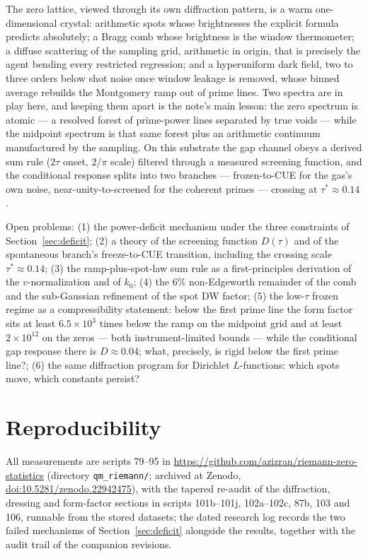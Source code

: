 \documentclass[12pt]{amsart}
\begin{document}
The zero lattice, viewed through its own diffraction pattern, is a warm
one-dimensional crystal: arithmetic spots whose brightnesses the
explicit formula predicts absolutely; a Bragg comb whose brightness is
the window thermometer; a diffuse scattering of the sampling grid,
arithmetic in origin, that is precisely the agent bending every
restricted regression; and a hyperuniform dark field, two to three
orders below shot noise once window leakage is removed, whose binned
average rebuilds the Montgomery ramp out of prime lines. Two spectra
are in play here, and keeping them apart is the note's main lesson:
the zero spectrum is atomic --- a resolved forest of prime-power lines
separated by true voids --- while the midpoint spectrum is that same
forest plus an arithmetic continuum manufactured by the sampling.
On this substrate the gap channel obeys a derived sum rule
($2\tau$ onset, $2/\pi$ scale) filtered through a measured screening
function, and the conditional response splits into two branches ---
frozen-to-CUE for the gas's own noise, near-unity-to-screened for the
coherent primes --- crossing at $\tau^* \approx 0.14$.

Open problems: (1) the power-deficit mechanism under the three
constraints of Section~\ref{sec:deficit}; (2) a theory of the screening
function $D(\tau)$ and of the spontaneous branch's freeze-to-CUE
transition, including the crossing scale $\tau^* \approx 0.14$; (3) the
ramp-plus-spot-law sum rule as a first-principles derivation of the
$v$-normalization and of $k_0$; (4) the $6\%$ non-Edgeworth remainder
of the comb and the sub-Gaussian refinement of the spot DW factor;
(5) the low-$\tau$ frozen regime as a compressibility statement:
below the first prime line the form factor sits at least
$6.5\times10^{3}$ times below the ramp on the midpoint grid and at
least $2\times10^{12}$ on the zeros --- both instrument-limited bounds
--- while the conditional gap response there is $D \approx 0.04$;
what, precisely, is rigid below the first prime line?; (6) the same
diffraction program for Dirichlet $L$-functions: which spots move,
which constants persist?

\section*{Reproducibility}

All measurements are scripts 79--95 in
\url{https://github.com/azizran/riemann-zero-statistics} (directory
\texttt{qm\_riemann/}; archived at Zenodo,
\href{https://doi.org/10.5281/zenodo.22942475}{doi:10.5281/zenodo.22942475}),
with the tapered re-audit of the diffraction, dressing and form-factor
sections in scripts 101b--101j, 102a--102c, 87b, 103 and 106,
runnable from the stored datasets; the dated research log records the
two failed mechanisms of Section~\ref{sec:deficit} alongside the
results, together with the audit trail of the companion revisions.
\end{document}

